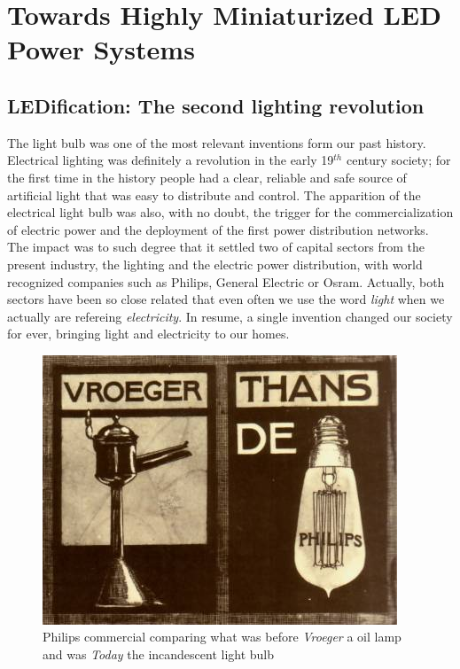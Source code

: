 \part{Towards Highly Miniaturized LED Power Systems }
\label{ch:twrd_HMLED}

\chapter[LEDification]{LEDification: The second lighting revolution}


The light bulb was one of the most relevant inventions form our past history.  Electrical lighting was definitely a revolution in the early 19$^{th}$ century society; for the first time in the history people had a clear, reliable and safe source of artificial light that was easy to distribute and control.
The apparition  of the electrical light bulb was also, with no doubt, the trigger for the commercialization of electric power and the deployment of the first power distribution networks. The impact was to such degree that it settled two of capital sectors from the present industry, the lighting and the electric power distribution, with  world recognized companies such as Philips, General Electric or Osram.  Actually, both sectors have been so close related that even often we use the word \emph{light} when we actually are refereing \emph{electricity}. In resume, a single invention changed our society for ever, bringing light and electricity to our homes.

\begin{figure}[!h]
\centering
\includegraphics{./0_intro/img/1900-philips3.jpg}
\caption{Philips commercial comparing what was before \emph{Vroeger} a oil lamp and was \emph{Today} the incandescent light bulb}
\label{fig:incandescent_light_blub}
\end{figure}


